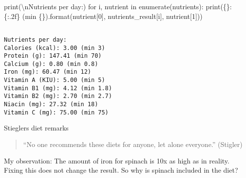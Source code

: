 \documentclass[
  ignorenonframetext,
]{beamer}
\newenvironment{Shaded}{\begin{snugshade}}{\end{snugshade}}
\newcommand{\BuiltInTok}[1]{\textcolor[rgb]{0.00,0.23,0.31}{#1}}
\newcommand{\CharTok}[1]{\textcolor[rgb]{0.13,0.47,0.30}{#1}}
\newcommand{\ControlFlowTok}[1]{\textcolor[rgb]{0.00,0.23,0.31}{#1}}
\newcommand{\DecValTok}[1]{\textcolor[rgb]{0.68,0.00,0.00}{#1}}
\newcommand{\KeywordTok}[1]{\textcolor[rgb]{0.00,0.23,0.31}{#1}}
\newcommand{\NormalTok}[1]{\textcolor[rgb]{0.00,0.23,0.31}{#1}}
\newcommand{\SpecialCharTok}[1]{\textcolor[rgb]{0.37,0.37,0.37}{#1}}
\newcommand{\StringTok}[1]{\textcolor[rgb]{0.13,0.47,0.30}{#1}}
\begin{document}
\begin{frame}[fragile]
\begin{Shaded}
\begin{Highlighting}[]
\BuiltInTok{print}\NormalTok{(}\StringTok{\textquotesingle{}}\CharTok{\textbackslash{}n}\StringTok{Nutrients per day:\textquotesingle{}}\NormalTok{)}
\ControlFlowTok{for}\NormalTok{ i, nutrient }\KeywordTok{in} \BuiltInTok{enumerate}\NormalTok{(nutrients):}
    \BuiltInTok{print}\NormalTok{(}\StringTok{\textquotesingle{}}\SpecialCharTok{\{\}}\StringTok{: }\SpecialCharTok{\{:.2f\}}\StringTok{ (min }\SpecialCharTok{\{\}}\StringTok{)\textquotesingle{}}\NormalTok{.}\BuiltInTok{format}\NormalTok{(nutrient[}\DecValTok{0}\NormalTok{], nutrients\_result[i],}
\NormalTok{                                       nutrient[}\DecValTok{1}\NormalTok{]))}
\end{Highlighting}
\end{Shaded}

\begin{verbatim}

Nutrients per day:
Calories (kcal): 3.00 (min 3)
Protein (g): 147.41 (min 70)
Calcium (g): 0.80 (min 0.8)
Iron (mg): 60.47 (min 12)
Vitamin A (KIU): 5.00 (min 5)
Vitamin B1 (mg): 4.12 (min 1.8)
Vitamin B2 (mg): 2.70 (min 2.7)
Niacin (mg): 27.32 (min 18)
Vitamin C (mg): 75.00 (min 75)
\end{verbatim}

\begin{block}{Stieglers diet remarks}
\protect\hypertarget{stieglers-diet-remarks}{}
\begin{quote}
``No one recommends these diets for anyone, let alone everyone.''
(Stigler)
\end{quote}

My observation: The amount of iron for spinach is 10x as high as in
reality. Fixing this does not change the result. So why is spinach
included in the diet?
\end{block}
\end{frame}
\end{document}
